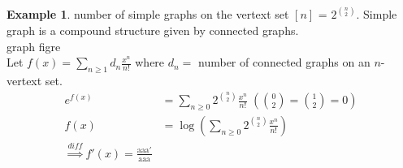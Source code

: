 \documentclass{article}
\theoremstyle{definition}
\newtheorem{ex}{Example}[]
\begin{document}
\begin{ex}
    number of simple graphs on the vertext set $[n]$ = $2^{n \choose 2}$. Simple
    graph is a compound structure given by connected graphs. \\ 
    graph figre\\ 
    Let $f(x) = \sum_{n\ge 1} d_n \frac{x^n}{n!}$ where $d_n = $ number of
    connected graphs on an $n$-vertext set. 
    \begin{align*}
        e^{f(x)} &= \sum_{n\ge 0} 2^{{n \choose 2}} \frac{x^n}{n!} \; 
        \left({0 \choose 2} = {1 \choose 2} = 0\right) \\ 
        f(x) &= \log \left( \sum_{n\ge 0} 2^{{n \choose 2}} \frac{x^n}{n!} \right) \\ 
        \overset{diff}{\Rightarrow} f'(x) = \frac{\text{aaa}'}{\text{aaa} }
    \end{align*}  
\end{ex}
\end{document}
